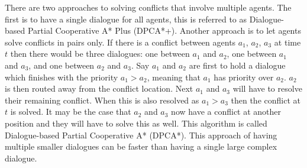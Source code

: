 %
%

There are two approaches to solving conflicts that involve multiple agents. The
first is to have a single dialogue for all agents, this is referred to as
Dialogue-based Partial Cooperative A* Plus (DPCA*+). Another approach is to let
agents solve conflicts in pairs only. If there is a conflict between agents
$a_1$, $a_2$, $a_3$ at time $t$ then there would be three dialogues: one
between $a_1$ and $a_2$, one between $a_1$ and $a_3$, and one between $a_2$ and
$a_3$. Say $a_1$ and $a_2$ are first to hold a dialogue which finishes with the
priority $a_1 > a_2$, meaning that $a_1$ has priority over $a_2$. $a_2$ is then
routed away from the conflict location. Next $a_1$ and $a_3$ will have to
resolve their remaining conflict. When this is also resolved as $a_1 > a_3$
then the conflict at $t$ is solved. It may be the case that $a_2$ and $a_3$ now
have a conflict at another position and they will have to solve this as well.
This algorithm is called Dialogue-based Partial Cooperative A* (DPCA*). This
approach of having multiple smaller dialogues can be faster than having a
single large complex dialogue.

